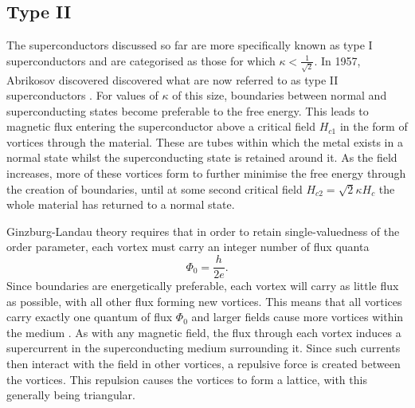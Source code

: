 \documentclass{article}
\numberwithin{equation}{section}
\begin{document}
\subsection{Type II}
The superconductors discussed so far are more specifically known as type I superconductors and are categorised as those for which $\kappa < \frac{1}{\sqrt{2}}$. In 1957, Abrikosov discovered discovered what are now referred to as type II superconductors \cite{Abrikosov1957TheAlloys}. For values of $\kappa$ of this size, boundaries between normal and superconducting states become preferable to the free energy. This leads to magnetic flux entering the superconductor above a critical field $H_{c1}$ in the form of vortices through the material. These are tubes within which the metal exists in a normal state whilst the superconducting state is retained around it. As the field increases, more of these vortices form to further minimise the free energy through the creation of boundaries, until at some second critical field $H_{c2} = \sqrt{2}\kappa H_c$ the whole material has returned to a normal state.

Ginzburg-Landau theory requires that in order to retain single-valuedness of the order parameter, each vortex must carry an integer number of flux quanta
\begin{equation}
    \Phi_0 = \frac{h}{2e}.
\end{equation}
Since boundaries are energetically preferable, each vortex will carry as little flux as possible, with all other flux forming new vortices. This means that all vortices carry exactly one quantum of flux $\Phi_0$ and larger fields cause more vortices within the medium \cite{Poole2014Superconductivity}. As with any magnetic field, the flux through each vortex induces a supercurrent in the superconducting medium surrounding it. Since such currents then interact with the field in other vortices, a repulsive force is created between the vortices. This repulsion causes the vortices to form a lattice, with this generally being triangular.
\end{document}
